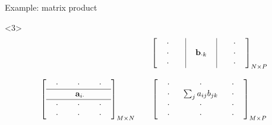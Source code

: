 \documentclass[14pt]{beamer}
\begin{document}
\begin{frame}{Example: matrix product}
\begin{onlyenv}<3>
\small
\[
\begin{array}{ccc}
&& \left[\begin{array}{c|c|c}
\ \ \cdot \ \ \ \ \, &   & \, \ \ \ \ \cdot \ \ \\
\ \ \cdot \ \ \ \ \, & \ \ \mb b_{\cdot k} \ \ & \, \ \ \ \ \cdot \ \ \\
\ \ \cdot \ \ \ \ \, & & \, \ \ \ \ \cdot \ \ \\
\end{array}\right]_{N \times P}\\
\\
\left[\begin{array}{ccc}
\ \ \cdot \ \ & \ \ \cdot \ \  & \ \ \cdot \ \ \\
\hline
& \ \mb a_{i\cdot} & \\
 \hline
\ \ \cdot \ \ & \ \ \cdot \ \  & \ \ \cdot \ \ \\
\ \ \cdot \ \ & \ \ \cdot \ \  & \ \ \cdot \ \ \\
\end{array}\right]_{M \times N}
&& \left[\begin{array}{ccc}
\ \ \cdot \ \ & \ \ \cdot \ \  & \ \ \cdot \ \ \\
\ \ \cdot \ \ & \sum_j a_{ij}b_{jk} & \ \ \cdot \ \ \\
\ \ \cdot \ \ & \ \ \cdot \ \  & \ \ \cdot \ \ \\
\ \ \cdot \ \ & \ \ \cdot \ \  & \ \ \cdot \ \ \\
\end{array}\right]_{M \times P}
\end{array}
\]
\end{onlyenv}
\end{frame}
\end{document}
